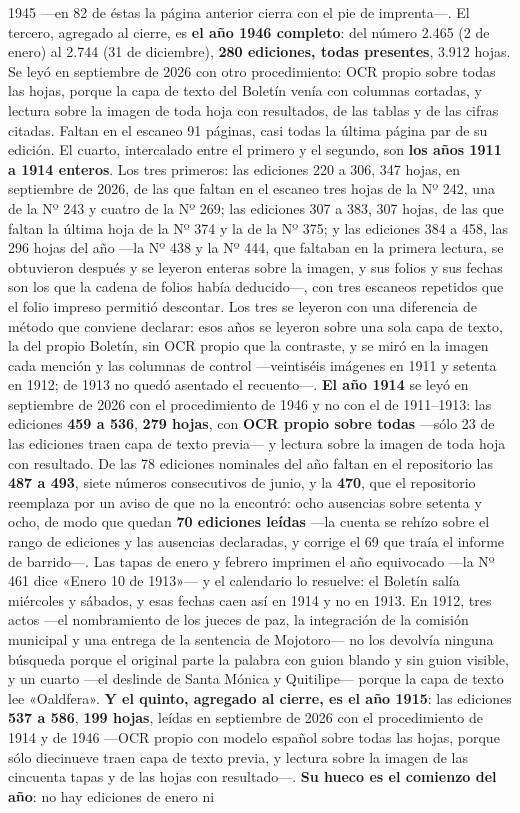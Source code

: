 1945 ---en 82 de éstas la página anterior cierra con el pie de imprenta---. El tercero, agregado al cierre, es \textbf{el año 1946 completo}: del número 2.465 (2 de enero) al 2.744 (31 de diciembre), \textbf{280 ediciones, todas presentes}, 3.912 hojas. Se leyó en septiembre de 2026 con otro procedimiento: OCR propio sobre todas las hojas, porque la capa de texto del Boletín venía con columnas cortadas, y lectura sobre la imagen de toda hoja con resultados, de las tablas y de las cifras citadas. Faltan en el escaneo 91 páginas, casi todas la última página par de su edición. El cuarto, intercalado entre el primero y el segundo, son \textbf{los años 1911 a 1914 enteros}. Los tres primeros: las ediciones 220 a 306, 347 hojas, en septiembre de 2026, de las que faltan en el escaneo tres hojas de la Nº 242, una de la Nº 243 y cuatro de la Nº 269; las ediciones 307 a 383, 307 hojas, de las que faltan la última hoja de la Nº 374 y la de la Nº 375; y las ediciones 384 a 458, las 296 hojas del año ---la Nº 438 y la Nº 444, que faltaban en la primera lectura, se obtuvieron después y se leyeron enteras sobre la imagen, y sus folios y sus fechas son los que la cadena de folios había deducido---, con tres escaneos repetidos que el folio impreso permitió descontar. Los tres se leyeron con una diferencia de método que conviene declarar: esos años se leyeron sobre una sola capa de texto, la del propio Boletín, sin OCR propio que la contraste, y se miró en la imagen cada mención y las columnas de control ---veintiséis imágenes en 1911 y setenta en 1912; de 1913 no quedó asentado el recuento---. \textbf{El año 1914} se leyó en septiembre de 2026 con el procedimiento de 1946 y no con el de 1911--1913: las ediciones \textbf{459 a 536}, \textbf{279 hojas}, con \textbf{OCR propio sobre todas} ---sólo 23 de las ediciones traen capa de texto previa--- y lectura sobre la imagen de toda hoja con resultado. De las 78 ediciones nominales del año faltan en el repositorio las \textbf{487 a 493}, siete números consecutivos de junio, y la \textbf{470}, que el repositorio reemplaza por un aviso de que no la encontró: ocho ausencias sobre setenta y ocho, de modo que quedan \textbf{70 ediciones leídas} ---la cuenta se rehízo sobre el rango de ediciones y las ausencias declaradas, y corrige el 69 que traía el informe de barrido---. Las tapas de enero y febrero imprimen el año equivocado ---la Nº 461 dice «Enero 10 de 1913»--- y el calendario lo resuelve: el Boletín salía miércoles y sábados, y esas fechas caen así en 1914 y no en 1913. En 1912, tres actos ---el nombramiento de los jueces de paz, la integración de la comisión municipal y una entrega de la sentencia de Mojotoro--- no los devolvía ninguna búsqueda porque el original parte la palabra con guion blando y sin guion visible, y un cuarto ---el deslinde de Santa Mónica y Quitilipe--- porque la capa de texto lee «Oaldfera». \textbf{Y el quinto, agregado al cierre, es el año 1915}: las ediciones \textbf{537 a 586}, \textbf{199 hojas}, leídas en septiembre de 2026 con el procedimiento de 1914 y de 1946 ---OCR propio con modelo español sobre todas las hojas, porque sólo diecinueve traen capa de texto previa, y lectura sobre la imagen de las cincuenta tapas y de las hojas con resultado---. \textbf{Su hueco es el comienzo del año}: no hay ediciones de enero ni 